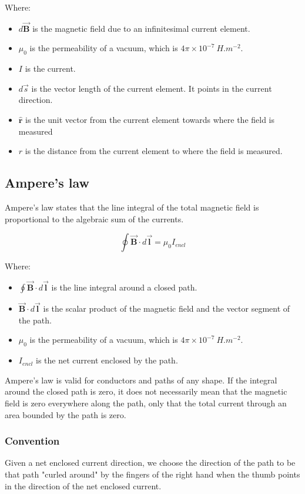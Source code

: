 \documentclass[11pt]{article}
\begin{document}
Where:
\begin{itemize}
\item \(d \vec{\boldsymbol{B}}\) is the magnetic field due to an infinitesimal current element.
\item \(\mu_0\) is the permeability of a vacuum, which is \(4 \pi \times 10^{-7} \ \unit{H.m^{-2}}\).
\item \(I\) is the current.
\item \(d \vec{s}\) is the vector length of the current element. It points in the current direction.
\item \(\hat{\boldsymbol{r}}\) is the unit vector from the current element towards where the field is measured
\item \(r\) is the distance from the current element to where the field is measured.
\end{itemize}

\newpage

\subsection{Ampere's law}
\label{sec:org7dd2990}
Ampere's law states that the line integral of the total magnetic field is proportional to the algebraic sum of the currents.

\[\oint \vec{\boldsymbol{B}} \cdot d \vec{\boldsymbol{l}} = \mu_0 I_{encl}\]

Where:
\begin{itemize}
\item \(\oint \vec{\boldsymbol{B}} \cdot d \vec{\boldsymbol{l}}\) is the line integral around a closed path.
\item \(\vec{\boldsymbol{B}} \cdot d \vec{\boldsymbol{l}}\) is the scalar product of the magnetic field and the vector segment of the path.
\item \(\mu_0\) is the permeability of a vacuum, which is \(4 \pi \times 10^{-7} \ \unit{H.m^{-2}}\).
\item \(I_{encl}\) is the net current enclosed by the path.
\end{itemize}

Ampere's law is valid for conductors and paths of any shape. If the integral around the closed path is zero, it does not necessarily mean that the magnetic field is zero everywhere along the path, only that the total current through an area bounded by the path is zero.

\subsubsection{Convention}
\label{sec:orga145ecb}
Given a net enclosed current direction, we choose the direction of the path to be that path "curled around" by the fingers of the right hand when the thumb points in the direction of the net enclosed current.
\end{document}
